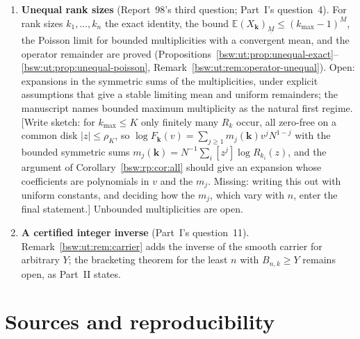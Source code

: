 \documentclass[11pt,letterpaper]{article}
\theoremstyle{definition}
\theoremstyle{remark}
\newcommand{\EE}{\mathbb E}
\newcommand{\fall}[2]{(#1)_{\underline{#2}}}
\begin{document}
\begin{enumerate}[leftmargin=2em]
\item\label{bsw:ut:q:unequal} \textbf{Unequal rank sizes} (Report~98's
third question; Part~I's question~4).  For rank sizes $k_1,\ldots,k_n$ the
exact identity, the bound $\EE\fall{X_{\mathbf k}}M\le(k_{\max}-1)^M$, the
Poisson limit for bounded multiplicities with a convergent mean, and the
operator remainder are proved
(Propositions~\ref{bsw:ut:prop:unequal-exact}--\ref{bsw:ut:prop:unequal-poisson},
Remark~\ref{bsw:ut:rem:operator-unequal}).  Open: expansions in the
symmetric sums of the multiplicities, under explicit assumptions that give
a stable limiting mean and uniform remainders; the manuscript names
bounded maximum multiplicity as the natural first regime.  [Write sketch:
for $k_{\max}\le K$ only finitely many $R_k$ occur, all zero-free on a
common disk $|z|\le\rho_K$, so
$\log F_{\mathbf k}(v)=\sum_{j\ge1}m_j(\mathbf k)v^jN^{1-j}$ with the
bounded symmetric sums $m_j(\mathbf k)=N^{-1}\sum_i[z^j]\log R_{k_i}(z)$,
and the argument of Corollary~\ref{bsw:rp:cor:all} should give an
expansion whose coefficients are polynomials in $v$ and the $m_j$.
Missing: writing this out with uniform constants, and deciding how the
$m_j$, which vary with $n$, enter the final statement.]  Unbounded
multiplicities are open.

\item \textbf{A certified integer inverse} (Part~I's question~11).
Remark~\ref{bsw:ut:rem:carrier} adds the inverse of the smooth carrier for
arbitrary $Y$; the bracketing theorem for the least $n$ with
$B_{n,k}\ge Y$ remains open, as Part~II states.
\end{enumerate}

\section{Sources and reproducibility}\label{bsw:ut:sec:sources}
\begingroup\setlength{\emergencystretch}{3em}
\end{document}
